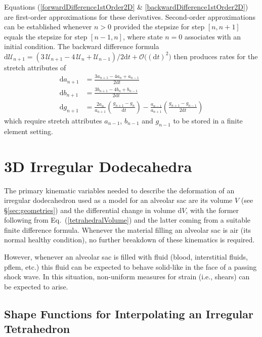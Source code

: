 Equations (\ref{forwardDifference1stOrder2D} \& \ref{backwardDifference1stOrder2D}) are first-order approximations for these derivatives.  Second-order approximations can be established whenever $n > 0$ provided the stepsize for step $[n, n+1]$ equals the stepsize for step $[n-1, n]$, where state $n=0$ associates with an initial condition.  The backward difference formula  $\mathrm{d} \boldsymbol{\mathcal{U}}_{n+1} = ( 3 \, \boldsymbol{\mathcal{U}}_{n+1} -  4 \, \boldsymbol{\mathcal{U}}_{n} + \boldsymbol{\mathcal{U}}_{n-1} ) / 2\mathrm{d}t + \mathcal{O} \bigl( (\mathrm{d}t)^2 \bigr)$ then produces rates for the stretch attributes of
\begin{equation}
\begin{aligned}
\mathrm{d} a_{n+1} & 
= \frac {3a_{n+1} - 4a_{n} +  a_{n-1}}{2\mathrm{d}t} \\ 
\mathrm{d} b_{n+1} & 
= \frac {3b_{n+1} - 4b_{n} +  b_{n-1}}{2\mathrm{d}t} \\
\mathrm{d} g_{n+1} & 
= \frac{2a_{n}} {a_{n+1}} \left(\frac{g_{n+1} - g_{n}}{\mathrm{d}t} \right) - \frac{a_{n-1}}{a_{n+1}} \left( \frac{g_{n+1} - g_{n-1}}{2\mathrm{d}t} \right) 
\end{aligned}
\label{backwardDifference2ndOrder2D}
\end{equation}
which require stretch attributes $a_{n-1}$, $b_{n-1}$ and $g_{n-1}$ to be stored in a finite element setting.

\section{3D Irregular Dodecahedra}

The primary kinematic variables needed to describe the deformation of an irregular dodecahedron used as a model for an alveolar sac are its volume $V$ (see \S\ref{sec:geometries}) and the differential change in volume $\mathrm{d}V$, with the former following from Eq.~(\ref{tetrahedralVolume}) and the latter coming from a suitable finite difference formula.  Whenever the material filling an alveolar sac is air (its normal healthy condition), no further breakdown of these kinematics is required.  

However, whenever an alveolar sac is filled with fluid (blood, interstitial fluids, pflem, etc.) this fluid can be expected to behave solid-like in the face of a passing shock wave.  In this situation, non-uniform measures for strain (i.e., shears) can be expected to arise.

\subsection{Shape Functions for Interpolating an Irregular Tetrahedron}

